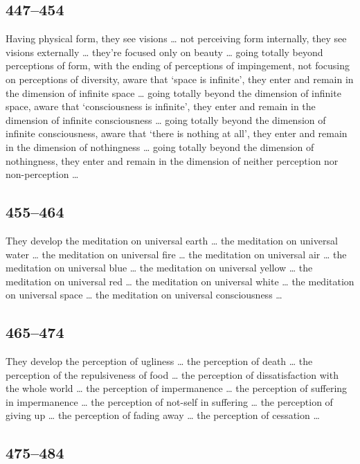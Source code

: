 \documentclass[12pt,openany]{book}%
\begin{document}
\subsection*{447–454 }

Having physical form, they see visions … not perceiving form internally, they see visions externally … they’re focused only on beauty … going totally beyond perceptions of form, with the ending of perceptions of impingement, not focusing on perceptions of diversity, aware that ‘space is infinite’, they enter and remain in the dimension of infinite space … going totally beyond the dimension of infinite space, aware that ‘consciousness is infinite’, they enter and remain in the dimension of infinite consciousness … going totally beyond the dimension of infinite consciousness, aware that ‘there is nothing at all’, they enter and remain in the dimension of nothingness … going totally beyond the dimension of nothingness, they enter and remain in the dimension of neither perception nor non-perception … 

\subsection*{455–464 }

They develop the meditation on universal earth … the meditation on universal water … the meditation on universal fire … the meditation on universal air … the meditation on universal blue … the meditation on universal yellow … the meditation on universal red … the meditation on universal white … the meditation on universal space … the meditation on universal consciousness … 

\subsection*{465–474 }

They develop the perception of ugliness … the perception of death … the perception of the repulsiveness of food … the perception of dissatisfaction with the whole world … the perception of impermanence … the perception of suffering in impermanence … the perception of not-self in suffering … the perception of giving up … the perception of fading away … the perception of cessation … 

\subsection*{475–484 }
\end{document}
